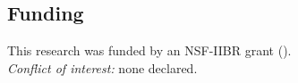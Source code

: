 
\subsection*{Funding}
This research was funded by an NSF-IIBR grant ().\\

\noindent \textit{Conflict of interest:} none declared.


\nolinenumbers


